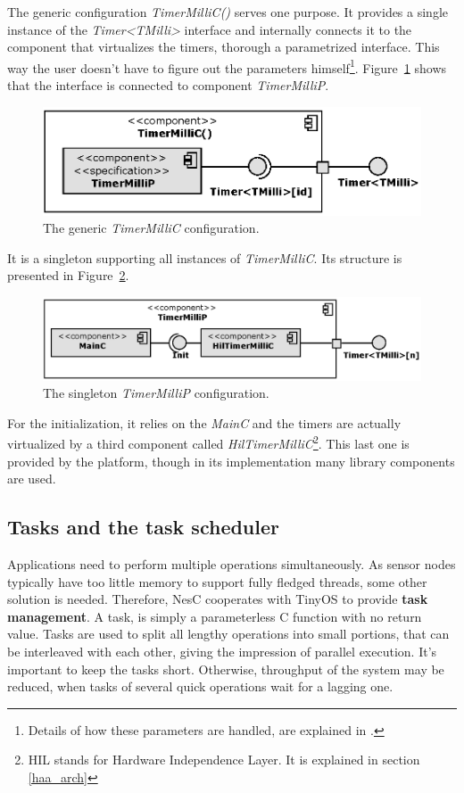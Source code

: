 The generic configuration \emph{TimerMilliC()} serves one purpose. It
provides a single instance of the \emph{Timer<TMilli>} interface and
internally connects it to the component that virtualizes the timers,
thorough a parametrized interface. This way the user doesn't have to
figure out the parameters himself\footnote{Details of how these
parameters are handled, are explained in \cite[ch. 6]{TOSProg}.}.
Figure~\ref{fig:timermillic} shows that the interface is connected to
component \emph{TimerMilliP}.
\begin{figure}[h]
  \centering
  \includegraphics{diagrams/timermillic.eps}
  \caption{The generic \emph{TimerMilliC} configuration.}
  \label{fig:timermillic}
\end{figure}
It is a singleton supporting all instances of \emph{TimerMilliC}. Its
structure is presented in Figure~\ref{fig:timermillip}.
\begin{figure}[h]
  \centering
  \includegraphics{diagrams/timermillip.eps}
  \caption{The singleton \emph{TimerMilliP} configuration.}
  \label{fig:timermillip}
\end{figure}
For the initialization, it relies on the \emph{MainC}
and the timers are actually virtualized by a third component called
\emph{HilTimerMilliC}\footnote{HIL stands for Hardware Independence
Layer. It is explained in section \ref{haa_arch}}. This last one is
provided by the platform, though in its implementation many library
components are used.

\subsection{Tasks and the task scheduler}

Applications need to perform multiple operations simultaneously. As
sensor nodes typically have too little memory to support fully fledged
threads, some other solution is needed. Therefore, NesC cooperates with
TinyOS to provide {\bf task management}. A task, is simply a
parameterless C function with no return value. Tasks are used to split
all lengthy operations into small portions, that can be interleaved
with each other, giving the impression of parallel execution. It's
important to keep the tasks short. Otherwise, throughput of the system
may be reduced, when tasks of several quick operations wait for a
lagging one.

